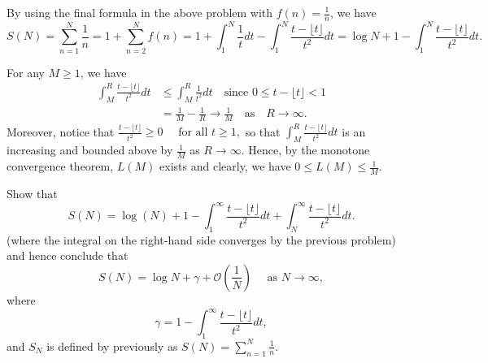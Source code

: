 \documentclass{elegantbook}
\begin{document}
\begin{problemset}[Exercises]
  \begin{solution}
    By using the final formula in the above problem with $f(n) = \frac{1}{n}$, we have
    \[
      S(N) = \sum_{n=1}^{N} \frac{1}{n} = 1 + \sum_{n=2}^{N} f(n) = 1 + \int_{1}^{N} \frac{1}{t} dt - \int_{1}^{N} \frac{t-\lfloor t \rfloor}{t^2} dt = \log N + 1 - \int_{1}^{N} \frac{t-\lfloor t \rfloor}{t^2} dt.
    \]

    For any $M\geq 1$, we have
    \[
    \begin{aligned}
      \int_{M}^{R} \frac{t-\lfloor t \rfloor}{t^2} dt &\leq \int_{M}^{R} \frac{1}{t^2} dt \quad \text{since } 0 \leq t-\lfloor t \rfloor < 1 \\
      &= \frac{1}{M} - \frac{1}{R} \to \frac{1}{M} \quad \text{as} \quad R \to \infty.
    \end{aligned}
    \]
    Moreover, notice that
    \(
      \frac{t-\lfloor t \rfloor}{t^2} \geq 0 \quad \text{ for all } t \geq 1,
    \)
    so that $\int_{M}^{R} \frac{t-\lfloor t \rfloor}{t^2} dt$ is an increasing and bounded above by $\frac{1}{M}$ as $R \to \infty$. Hence, by the monotone convergence theorem, $L(M)$ exists and clearly, we have $0 \leq L(M) \leq \frac{1}{M}$.
  \end{solution}


  \item Show that 
  \[
    S(N) = \log(N) + 1 - \int_{1}^\infty \frac{t-\lfloor t \rfloor}{t^2} dt + \int_{N}^{\infty} \frac{t-\lfloor t \rfloor}{t^2} dt.
  \]
  (where the integral on the right-hand side converges by the previous problem) and hence conclude that
  \[
    S(N) = \log N + \gamma + \mathcal{O}\left( \frac{1}{N} \right) \quad \text{ as } N \to \infty,
  \]
  where 
  \[
    \gamma = 1 - \int_{1}^{\infty} \frac{t-\lfloor t \rfloor}{t^2} dt,
  \]
  and $S_N$ is defined by previously as $S(N) = \sum_{n=1}^{N} \frac{1}{n}$.
  

\end{problemset}
\end{document}
